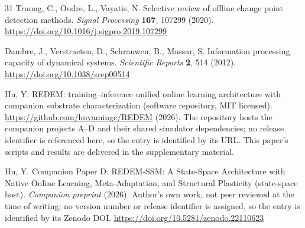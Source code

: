 \documentclass[preprint,12pt]{elsarticle}
\begin{document}
\begin{thebibliography}{31}
 Truong, C., Oudre, L., Vayatis, N. Selective review of
offline change point detection methods. \emph{Signal Processing}
\textbf{167}, 107299 (2020).
\url{https://doi.org/10.1016/j.sigpro.2019.107299}

 Dambre, J., Verstraeten, D., Schrauwen, B., Massar, S.
Information processing capacity of dynamical systems. \emph{Scientific
Reports} \textbf{2}, 514 (2012). \url{https://doi.org/10.1038/srep00514}

 Hu, Y. REDEM: training--inference unified online learning
architecture with companion substrate characterization (software repository,
MIT licensed). \url{https://github.com/huyamingc/REDEM} (2026). The repository
hosts the companion projects A--D and their shared simulator dependencies;
no release identifier is referenced here, so the entry is identified by its
URL. This paper's scripts and results are delivered in the supplementary material.

 Hu, Y. Companion Paper D: REDEM-SSM: A State-Space
Architecture with Native Online Learning, Meta-Adaptation, and Structural
Plasticity (state-space host). \emph{Companion preprint} (2026). Author's own
work, not peer reviewed at the time of writing; no version number or release
identifier is assigned, so the entry is identified by its Zenodo DOI.
\url{https://doi.org/10.5281/zenodo.22110623}

\end{thebibliography}
\end{document}
